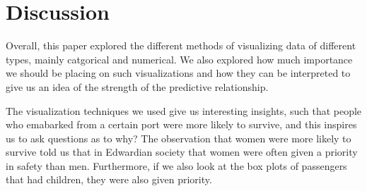 \documentclass[a4paper, twocolumn]{article}
\begin{document}
\section{Discussion}
Overall, this paper explored the different methods of visualizing data of different types, mainly catgorical and 
numerical. We also explored how much importance we should be placing on such visualizations and how they can be 
interpreted to give us an idea of the strength of the predictive relationship.

The visualization techniques we used give us interesting insights, such that people who emabarked from a certain
port were more likely to survive, and this inspires us to ask questions as to why? The observation that women
were more likely to survive told us that in Edwardian society that women were often given a priority in safety than
men. Furthermore, if we also look at the box plots of passengers that had children, they were also given priority. 
\end{document}
